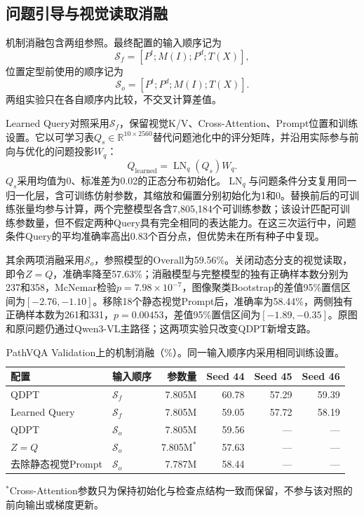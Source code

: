 \documentclass[pdflatex,sn-mathphys-num]{sn-jnl}
\begin{document}
\subsection{问题引导与视觉读取消融}

机制消融包含两组参照。最终配置的输入顺序记为
\begin{equation}
    \mathcal{S}_{f}=[P^{t};M(I);P^{d};T(X)],
\end{equation}
位置定型前使用的顺序记为
\begin{equation}
    \mathcal{S}_{o}=[P^{t};P^{d};M(I);T(X)].
\end{equation}
两组实验只在各自顺序内比较，不交叉计算差值。

Learned Query对照采用$\mathcal{S}_{f}$，保留视觉K/V、Cross-Attention、Prompt位置和训练设置。它以可学习表$Q_s\in\mathbb{R}^{10\times2560}$替代问题池化中的评分矩阵，并沿用实际参与前向与优化的问题投影$W_q$：
\begin{equation}
    Q_{\mathrm{learned}}=\operatorname{LN}_q(Q_s)W_q.
\end{equation}
$Q_s$采用均值为0、标准差为0.02的正态分布初始化。$\operatorname{LN}_q$与问题条件分支复用同一归一化层，含可训练仿射参数，其缩放和偏置分别初始化为1和0。替换前后的可训练张量均参与计算，两个完整模型各含7,805,184个可训练参数；该设计匹配可训练参数量，但不假定两种Query具有完全相同的表达能力。在这三次运行中，问题条件Query的平均准确率高出0.83个百分点，但优势未在所有种子中复现。

其余两项消融采用$\mathcal{S}_{o}$，参照模型的Overall为59.56\%。关闭动态分支的视觉读取，即令$Z=Q$，准确率降至57.63\%；消融模型与完整模型的独有正确样本数分别为237和358，McNemar检验$p=7.98\times10^{-7}$，图像聚类Bootstrap的差值95\%置信区间为$[-2.76,-1.10]$。移除18个静态视觉Prompt后，准确率为58.44\%，两侧独有正确样本数为261和331，$p=0.00453$，差值95\%置信区间为$[-1.89,-0.35]$。原图和原问题仍通过Qwen3-VL主路径；这两项实验只改变QDPT新增支路。

\begin{table}[t]
    \centering
    \caption{PathVQA Validation上的机制消融（\%）。同一输入顺序内采用相同训练设置。}
    \label{tab:mechanism-ablation}
    \scriptsize
    \setlength{\tabcolsep}{2pt}
    \begin{tabular}{@{}llrrrr@{}}
        \toprule
        配置 & 输入顺序 & 参数量 & Seed 44 & Seed 45 & Seed 46 \\
        \midrule
        QDPT & $\mathcal{S}_{f}$ & 7.805M & 60.78 & 57.29 & 59.39 \\
        Learned Query & $\mathcal{S}_{f}$ & 7.805M & 59.05 & 57.72 & 58.19 \\
        \midrule
        QDPT & $\mathcal{S}_{o}$ & 7.805M & 59.56 & --- & --- \\
        $Z=Q$ & $\mathcal{S}_{o}$ & 7.805M$^{*}$ & 57.63 & --- & --- \\
        去除静态视觉Prompt & $\mathcal{S}_{o}$ & 7.787M & 58.44 & --- & --- \\
        \bottomrule
    \end{tabular}
    \par\smallskip
    \raggedright\footnotesize $^{*}$Cross-Attention参数只为保持初始化与检查点结构一致而保留，不参与该对照的前向输出或梯度更新。
\end{table}
\end{document}
